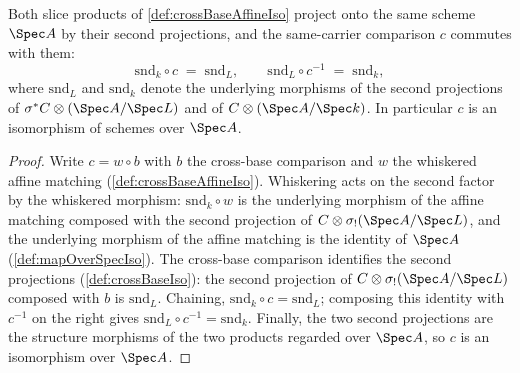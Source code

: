 \begin{lemma}
  \label{lem:crossBaseAffineIso_snd}
  \leanok
  Both slice products of \ref{def:crossBaseAffineIso} project onto the same scheme
  \(\Spec A\) by their second projections, and the same-carrier comparison \(c\)
  commutes with them:
  \[
    \mathrm{snd}_{k} \circ c \;=\; \mathrm{snd}_{L},
    \qquad
    \mathrm{snd}_{L} \circ c^{-1} \;=\; \mathrm{snd}_{k},
  \]
  where \(\mathrm{snd}_{L}\) and \(\mathrm{snd}_{k}\) denote the underlying morphisms of
  the second projections of \(\sigma^{*}C \otimes (\Spec A/\Spec L)\) and of
  \(C \otimes (\Spec A/\Spec k)\). In particular \(c\) is an isomorphism of schemes over
  \(\Spec A\).
\end{lemma}
\begin{proof}
  \leanok
  Write \(c = w \circ b\) with \(b\) the cross-base comparison and \(w\) the whiskered
  affine matching (\ref{def:crossBaseAffineIso}). Whiskering acts on the second factor
  by the whiskered morphism: \(\mathrm{snd}_{k} \circ w\) is the underlying morphism of
  the affine matching composed with the second projection of
  \(C \otimes \sigma_{!}(\Spec A/\Spec L)\), and the underlying morphism of the affine
  matching is the identity of \(\Spec A\) (\ref{def:mapOverSpecIso}). The cross-base
  comparison identifies the second projections (\ref{def:crossBaseIso}): the second
  projection of \(C \otimes \sigma_{!}(\Spec A/\Spec L)\) composed with \(b\) is
  \(\mathrm{snd}_{L}\). Chaining, \(\mathrm{snd}_{k} \circ c = \mathrm{snd}_{L}\);
  composing this identity with \(c^{-1}\) on the right gives
  \(\mathrm{snd}_{L} \circ c^{-1} = \mathrm{snd}_{k}\). Finally, the two second
  projections are the structure morphisms of the two products regarded over
  \(\Spec A\), so \(c\) is an isomorphism over \(\Spec A\).
\end{proof}

